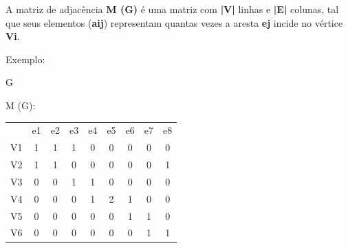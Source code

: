 \documentclass[a4paper, 12pt]{article}
\begin{document}
    A matriz de adjacência \textbf{M (G) } é uma matriz com \textbf{|V|} linhas e \textbf{|E|} colunas, tal que seus elementos (\textbf{aij}) representam quantas vezes a aresta \textbf{ej} incide no vértice \textbf{Vi}.
    
    \vspace{0.5in}
    
    Exemplo:
    
    \begin{multicols}{2}
        \begin{center}
        G\:
        \end{center}
        
        \begin{center}
        M (G):
        \end{center}
        \begin{tabular}{ccccccccc}
            & e1 & e2 & e3 & e4 & e5 & e6 & e7 & e8 \\
            V1 & 1  & 1  & 1  & 0  & 0  & 0  & 0  & 0  \\
            V2 & 1  & 1  & 0  & 0  & 0  & 0  & 0  & 1  \\
            V3 & 0  & 0  & 1  & 1  & 0  & 0  & 0  & 0  \\
            V4 & 0  & 0  & 0  & 1  & 2  & 1  & 0  & 0  \\
            V5 & 0  & 0  & 0  & 0  & 0  & 1  & 1  & 0  \\
            V6 & 0  & 0  & 0  & 0  & 0  & 0  & 1  & 1 
        \end{tabular}
    \end{multicols}
    
    \vspace{0.5in}
    
\end{document}
